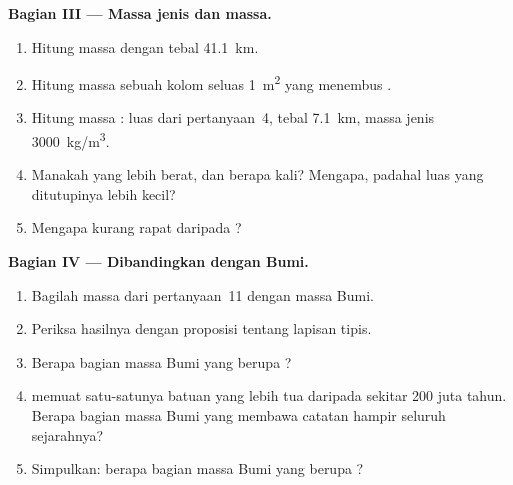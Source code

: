 \begin{problem}
\medskip
\noindent\textbf{Bagian III --- Massa jenis dan massa.}
\begin{enumerate}[resume]
  \item Hitung massa  dengan tebal \qty{41.1}{km}.
  \item Hitung massa sebuah kolom seluas \qty{1}{m^2} yang menembus .
  \item Hitung massa : luas dari pertanyaan~4,
        tebal \qty{7.1}{km}, massa jenis \qty{3000}{kg/m^3}.
  \item Manakah yang lebih berat, dan berapa kali? Mengapa, padahal luas yang
        ditutupinya lebih kecil?
  \item Mengapa  kurang rapat daripada ?
\end{enumerate}

\medskip
\noindent\textbf{Bagian IV --- Dibandingkan dengan Bumi.}
\begin{enumerate}[resume]
  \item Bagilah massa dari pertanyaan~11 dengan massa Bumi.
  \item Periksa hasilnya dengan proposisi tentang lapisan tipis.
  \item Berapa bagian massa Bumi yang berupa ?
  \item {} memuat satu-satunya batuan yang lebih tua daripada sekitar
        200 juta tahun. Berapa bagian massa Bumi yang membawa catatan hampir
        seluruh sejarahnya?
  \item Simpulkan: berapa bagian massa Bumi yang berupa ?
\end{enumerate}
\end{problem}

